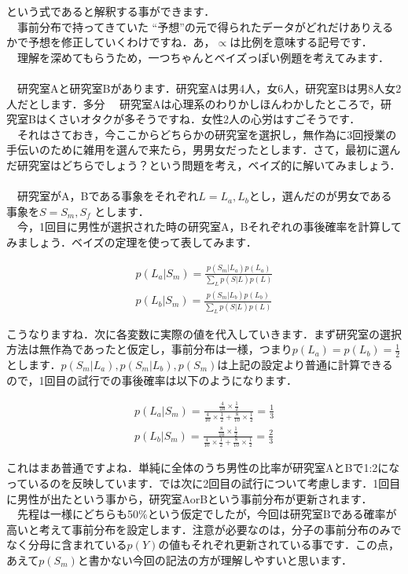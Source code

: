 \documentclass[11pt,a4paper]{ujreport} 	%
\begin{document}
という式であると解釈する事ができます．\\
　事前分布で持ってきていた ``予想''の元で得られたデータがどれだけありえるかで予想を修正していくわけですね．あ，$\propto$は比例を意味する記号です．\\
　理解を深めてもらうため，一つちゃんとベイズっぽい例題を考えてみます．\\
\\
　研究室Aと研究室Bがあります．研究室Aは男4人，女6人，研究室Bは男8人女2人だとします．多分
　研究室Aは心理系のわりかしほんわかしたところで，研究室Bはくさいオタクが多そうですね．女性2人の心労はすごそうです．\\
　それはさておき，今ここからどちらかの研究室を選択し，無作為に3回授業の手伝いのために雑用を選んで来たら，男男女だったとします．さて，最初に選んだ研究室はどちらでしょう？という問題を考え，ベイズ的に解いてみましょう．\\
  \\
　研究室がA，Bである事象をそれぞれ$L=L_a, L_b$とし，選んだのが男女である事象を$S=S_m, S_f$
とします．\\
　今，1回目に男性が選択された時の研究室A，Bそれぞれの事後確率を計算してみましょう．ベイズの定理を使って表してみます．
  
\begin{align}
p(L_a | S_m) = \frac{p(S_m|L_a)p(L_a)}{\sum_L p(S|L)p(L)}\\
p(L_b | S_m) = \frac{p(S_m | L_b)p(L_b)}{\sum_L p(S|L)p(L)}
\end{align}

こうなりますね．次に各変数に実際の値を代入していきます．まず研究室の選択方法は無作為であったと仮定し，事前分布は一様，つまり$p(L_a)=p(L_b)=\frac{1}{2}$とします．$p(S_m|L_a), p(S_m|L_b), p(S_m)$は上記の設定より普通に計算できるので，1回目の試行での事後確率は以下のようになります．

\begin{align}
p(L_a | S_m) = \frac{\frac{4}{10} \times \frac{1}{2}}{ \frac{4}{10}\times \frac{1}{2} + \frac{8}{10}\times \frac{1}{2}} = \frac{1}{3}\\
p(L_b | S_m) = \frac{\frac{8}{10} \times \frac{1}{2}}{ \frac{4}{10}\times \frac{1}{2} + \frac{8}{10}\times \frac{1}{2}} = \frac{2}{3}
\end{align}

これはまあ普通ですよね．単純に全体のうち男性の比率が研究室AとBで1:2になっているのを反映しています．では次に2回目の試行について考慮します．1回目に男性が出たという事から，研究室AorBという事前分布が更新されます．\\
　先程は一様にどちらも50\%という仮定でしたが，今回は研究室Bである確率が高いと考えて事前分布を設定します．注意が必要なのは，分子の事前分布のみでなく分母に含まれている$p(Y)$の値もそれぞれ更新されている事です．この点，あえて$p(S_m)$と書かない今回の記法の方が理解しやすいと思います．
\end{document}
